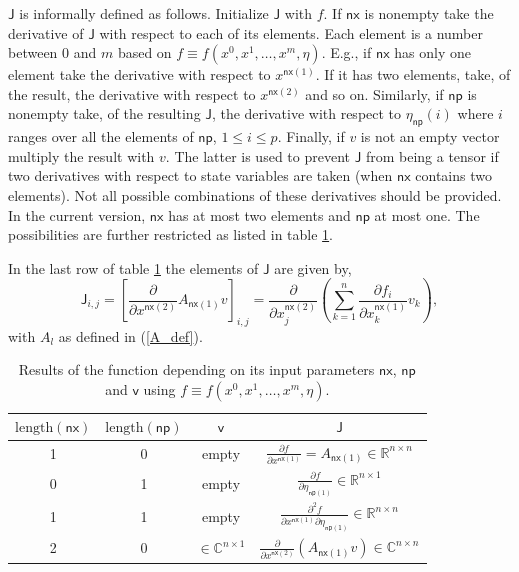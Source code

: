 \documentclass[10pt]{article}
\gdef \file#1{{\bfseries{\ttfamily{#1}}}}
\gdef \parm#1{{\mathsf{#1}}}
\gdef \RR{{\mathbb R}}
\gdef \CC{{\mathbb C}}
\begin{document}
{\begin{itemize}
$\parm{J}$ is informally defined as follows. Initialize $\parm{J}$ with $f$. If 
$\parm{nx}$ is nonempty take the derivative of $\parm{J}$
with respect to each of its elements. Each element is a number between 0 and $m$
based on $f\equiv f(x^0,x^1,\ldots,x^m,\eta)$.
E.g., if $\parm{nx}$ has only one element take the derivative
with respect to $x^{\parm{nx}(1)}$. 
If it has two elements, take, of the result, the derivative with respect
to $x^{\parm{nx}(2)}$ and so on.
Similarly, 
if $\parm{np}$ is nonempty take, of the resulting $\parm{J}$,
the derivative with respect to $\eta_\parm{np}(i)$ where $i$ ranges
over all the elements of $\parm{np}$, $1\leq i \leq p$.  
Finally, if $v$ is not an empty vector multiply the result with $v$.
The latter is used to prevent $\parm{J}$ from being a tensor
if two derivatives with respect to state variables are taken
(when $\parm{nx}$ contains two elements).
Not all possible combinations of these derivatives should be
provided. 
In the current version, $\parm{nx}$ has at most two elements and $\parm{np}$
at most one. 
The possibilities are further restricted as listed in 
table \ref{deri_requested}.

In the last row of table \ref{deri_requested} the elements of $\parm{J}$
are given by,
\[
\parm{J}_{i,j}=\left[\frac{\partial}{\partial x^{\parm{nx}(2)}}
A_{\parm{nx}(1)}v\right]_{i,j}
=\frac{\partial}{\partial x_j^{\parm{nx}(2)}}
\left(\sum_{k=1}^n\frac{\partial f_i}{\partial x_k^{\parm{nx}(1)}} v_k
\right),
\]
with $A_l$ as defined in (\ref{A_def}).

\begin{table}[h]
\begin{center}
\begin{tabular}{ccc|c}
$\mathrm{length}(\parm{nx})$ & $\mathrm{length}(\parm{np})$  & $\parm{v}$ & $\parm{J}$ \\\hline
1         & 0         & empty      & 
$\frac{\partial f}{\partial x^{\parm{nx}(1)}}
=A_{\parm{nx}(1)}\in\RR^{n\times n}$ \\
0         & 1         & empty      & 
$\frac{\partial f}{\partial \eta_{\parm{np}(1)}}
\in\RR^{n\times 1}$ \\
1         & 1         & empty      & 
$\frac{\partial^2 f}{\partial x^{\parm{nx}(1)}\partial \eta_{\parm{np(1)}}}
\in\RR^{n\times n}$ \\
2         & 0         & $\in\CC^{n\times1}$ & 
$\frac{\partial}{\partial x^{\parm{nx}(2)}}
\left(A_{\parm{nx}(1)}v\right)
\in\CC^{n\times n}$
\end{tabular}
\caption{\small\label{deri_requested}
Results of the function \file{sys\_deri} depending on its
input parameters $\parm{nx}$, $\parm{np}$ and $\parm{v}$
using $f\equiv f(x^0,x^1,\ldots,x^m,\eta)$.}
\end{center}
\end{table}


\end{itemize}}
\end{document}
